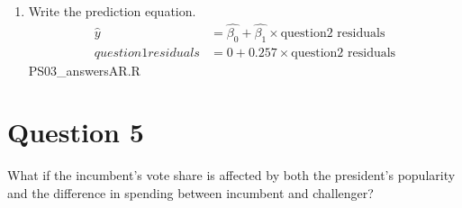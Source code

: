 \documentclass[12pt,letterpaper]{article}
\begin{document}
\begin{enumerate}
\begin{figure}[h!]
		\end{figure}
		\item Write the prediction equation.
		\begin{align*}
			\hat{y} &= \hat{\beta_0} + \hat{\beta_1} \times  \text{question2 residuals}\\
			question1 residuals &= 0 + 0.257 \times \text{question2 residuals}
		\end{align*}
		 {PS03_answersAR.R}
	\end{enumerate}
	\newpage	

\section*{Question 5}
\noindent What if the incumbent's vote share is affected by both the president's popularity and the difference in spending between incumbent and challenger? 
\end{document}
